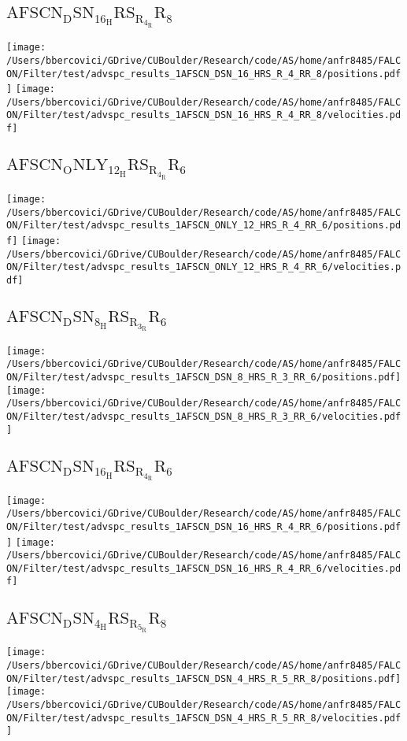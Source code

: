 \subsection{$\mathrm{AFSCN_DSN_16_HRS_R_4_RR_8}$}
\texttt{[image: /Users/bbercovici/GDrive/CUBoulder/Research/code/AS/home/anfr8485/FALCON/Filter/test/advspc\_results\_1AFSCN\_DSN\_16\_HRS\_R\_4\_RR\_8/positions.pdf]}
\texttt{[image: /Users/bbercovici/GDrive/CUBoulder/Research/code/AS/home/anfr8485/FALCON/Filter/test/advspc\_results\_1AFSCN\_DSN\_16\_HRS\_R\_4\_RR\_8/velocities.pdf]}
\subsection{$\mathrm{AFSCN_ONLY_12_HRS_R_4_RR_6}$}
\texttt{[image: /Users/bbercovici/GDrive/CUBoulder/Research/code/AS/home/anfr8485/FALCON/Filter/test/advspc\_results\_1AFSCN\_ONLY\_12\_HRS\_R\_4\_RR\_6/positions.pdf]}
\texttt{[image: /Users/bbercovici/GDrive/CUBoulder/Research/code/AS/home/anfr8485/FALCON/Filter/test/advspc\_results\_1AFSCN\_ONLY\_12\_HRS\_R\_4\_RR\_6/velocities.pdf]}
\subsection{$\mathrm{AFSCN_DSN_8_HRS_R_3_RR_6}$}
\texttt{[image: /Users/bbercovici/GDrive/CUBoulder/Research/code/AS/home/anfr8485/FALCON/Filter/test/advspc\_results\_1AFSCN\_DSN\_8\_HRS\_R\_3\_RR\_6/positions.pdf]}
\texttt{[image: /Users/bbercovici/GDrive/CUBoulder/Research/code/AS/home/anfr8485/FALCON/Filter/test/advspc\_results\_1AFSCN\_DSN\_8\_HRS\_R\_3\_RR\_6/velocities.pdf]}
\subsection{$\mathrm{AFSCN_DSN_16_HRS_R_4_RR_6}$}
\texttt{[image: /Users/bbercovici/GDrive/CUBoulder/Research/code/AS/home/anfr8485/FALCON/Filter/test/advspc\_results\_1AFSCN\_DSN\_16\_HRS\_R\_4\_RR\_6/positions.pdf]}
\texttt{[image: /Users/bbercovici/GDrive/CUBoulder/Research/code/AS/home/anfr8485/FALCON/Filter/test/advspc\_results\_1AFSCN\_DSN\_16\_HRS\_R\_4\_RR\_6/velocities.pdf]}
\subsection{$\mathrm{AFSCN_DSN_4_HRS_R_5_RR_8}$}
\texttt{[image: /Users/bbercovici/GDrive/CUBoulder/Research/code/AS/home/anfr8485/FALCON/Filter/test/advspc\_results\_1AFSCN\_DSN\_4\_HRS\_R\_5\_RR\_8/positions.pdf]}
\texttt{[image: /Users/bbercovici/GDrive/CUBoulder/Research/code/AS/home/anfr8485/FALCON/Filter/test/advspc\_results\_1AFSCN\_DSN\_4\_HRS\_R\_5\_RR\_8/velocities.pdf]}
